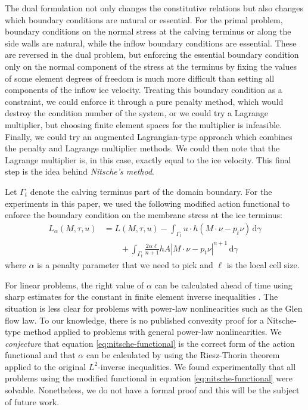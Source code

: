 \documentclass{article}
\theoremstyle{definition}
\theoremstyle{plain}
\newcommand{\ud}{\hspace{2pt}\mathrm{d}}
\begin{document}
The dual formulation not only changes the constitutive relations but also changes which boundary conditions are natural or essential.
For the primal problem, boundary conditions on the normal stress at the calving terminus or along the side walls are natural, while the inflow boundary conditions are essential.
These are reversed in the dual problem, but enforcing the essential boundary condition only on the normal component of the stress at the terminus by fixing the values of some element degrees of freedom is much more difficult than setting all components of the inflow ice velocity.
Treating this boundary condition as a constraint, we could enforce it through a pure penalty method, which would destroy the condition number of the system, or we could try a Lagrange multiplier, but choosing finite element spaces for the multiplier is infeasible.
Finally, we could try an augmented Lagrangian-type approach which combines the penalty and Lagrange multiplier methods.
We could then note that the Lagrange multiplier is, in this case, exactly equal to the ice velocity.
This final step is the idea behind \emph{Nitsche's method}.

Let $\Gamma_t$ denote the calving terminus part of the domain boundary.
For the experiments in this paper, we used the following modified action functional to enforce the boundary condition on the membrane stress at the ice terminus:
\begin{align}
    L_\alpha(M, \tau, u) & = L(M, \tau, u) - \int_{\Gamma_t}u\cdot h\left(M\cdot\nu - p_t\nu\right)\ud\gamma \nonumber\\
    & \qquad + \int_{\Gamma_t}\frac{2\alpha\ell}{n + 1}hA\left|M\cdot\nu - p_t\nu\right|^{n + 1}\ud\gamma
    \label{eq:nitsche-functional}
\end{align}
where $\alpha$ is a penalty parameter that we need to pick and $\ell$ is the local cell size.

For linear problems, the right value of $\alpha$ can be calculated ahead of time using sharp estimates for the constant in finite element inverse inequalities \citep{warburton2003constants}.
The situation is less clear for problems with power-law nonlinearities such as the Glen flow law.
To our knowledge, there is no published convexity proof for a Nitsche-type method applied to problems with general power-law nonlinearities.
We \emph{conjecture} that equation \eqref{eq:nitsche-functional} is the correct form of the action functional and that $\alpha$ can be calculated by using the Riesz-Thorin theorem applied to the original $L^2$-inverse inequalities.
We found experimentally that all problems using the modified functional in equation \eqref{eq:nitsche-functional} were solvable.
Nonetheless, we do not have a formal proof and this will be the subject of future work.


\pagebreak



\end{document}
